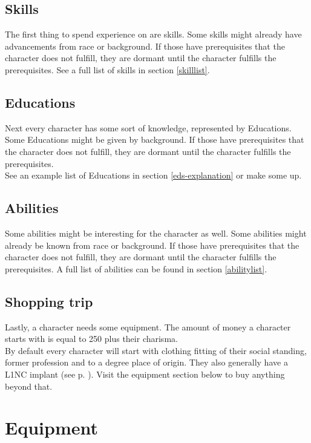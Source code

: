 \documentclass[11pt,a4paper,openany,dvipsnames]{book}
\begin{document}
	\section{Skills}
	The first thing to spend experience on are skills. Some skills might already have advancements from race or background. If those have prerequisites that the character does not fulfill, they are dormant until the character fulfills the prerequisites. See a full list of skills in section \ref{skilllist}.
	\section{Educations}
	Next every character has some sort of knowledge, represented by Educations.
	Some Educations might be given by background.
	If those have prerequisites that the character does not fulfill,
		they are dormant until the character fulfills the prerequisites.\\
	See an example list of Educations in section \ref{eds-explanation} or make some up.
	\section{Abilities}
	Some abilities might be interesting for the character as well. Some abilities might already be known from race or background. If those have prerequisites that the character does not fulfill, they are dormant until the character fulfills the prerequisites. A full list of abilities can be found in section \ref{abilitylist}.
	\section{Shopping trip}
	Lastly, a character needs some equipment. The amount of money a character starts with is equal to 250 plus their charisma. \\
	By default every character will start with clothing fitting of their social standing, former profession and to a degree place of origin.
	They also generally have a L1NC implant (see p. \pageref{implant:l1nc}).
	Visit the equipment section below to buy anything beyond that.

	\chapter{Equipment}
	
	
	
	
	
	
	
\end{document}

